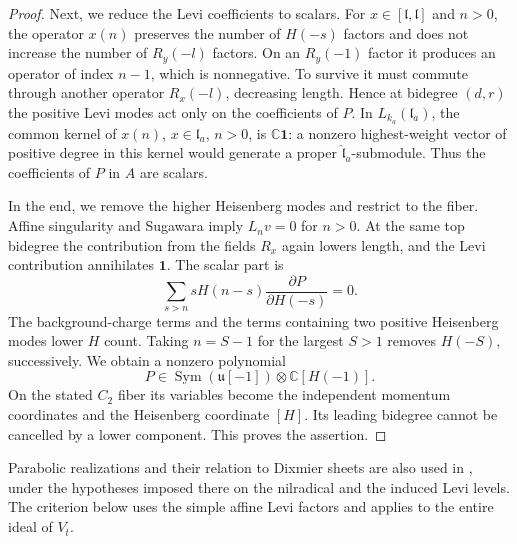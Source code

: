 \documentclass[11pt,a4paper]{amsart}
\numberwithin{equation}{section}
\theoremstyle{definition}
\theoremstyle{remark}
\newcommand{\C}{\mathbb C}
\newcommand{\uu}{\mathfrak u}
\newcommand{\lev}{\mathfrak l}
\newcommand{\Sym}{\operatorname{Sym}}
\begin{document}
\begin{proof}
Next, we reduce the Levi coefficients to scalars.
For $x\in[\lev,\lev]$ and $n>0$, the operator $x(n)$ preserves
the number of $H(-s)$ factors and does not increase the number of
$R_y(-l)$ factors. On an $R_y(-1)$ factor it produces an operator of index $n-1$,
which is nonnegative. To survive it must commute through another operator $R_x(-l)$, decreasing length. Hence at bidegree $(d,r)$ the
positive Levi modes act only on the coefficients of $P$.
In $L_{k_a}(\lev_a)$, the common kernel of $x(n)$,
$x\in\lev_a$, $n>0$, is $\C\mathbf1$: a nonzero
highest-weight vector of positive degree in this kernel would
generate a proper $\widehat{\lev}_a$-submodule. Thus the
coefficients of $P$ in $A$ are scalars.

In the end, we remove the higher Heisenberg modes and restrict to the fiber. 
Affine singularity and Sugawara imply $L_nv=0$ for $n>0$.
At the same top bidegree the contribution from the fields $R_x$ again lowers
length, and the Levi contribution annihilates $\mathbf1$. The scalar part is
$$
 \sum_{s>n}sH(n-s)\frac{\partial P}{\partial H(-s)}=0.
$$
The background-charge terms and the terms containing two positive Heisenberg
modes lower $H$ count.
Taking $n=S-1$ for the largest $S>1$ removes $H(-S)$, successively.
We obtain a nonzero polynomial
$$
                 P\in\Sym(\uu[-1])\otimes\C[H(-1)].
$$
On the stated $C_2$ fiber its variables become the independent
momentum coordinates and the Heisenberg coordinate $[H]$. Its leading bidegree cannot be
cancelled by a lower component. This proves the assertion.
\end{proof}

Parabolic realizations and their relation to Dixmier sheets are also
used in \cite[Theorem~3.24]{ArakawaFutornyKrizka2024}, under the hypotheses imposed
there on the nilradical and the induced Levi levels. The criterion below
uses the simple affine Levi factors and applies to the entire ideal
of $V_t$.
\end{document}
